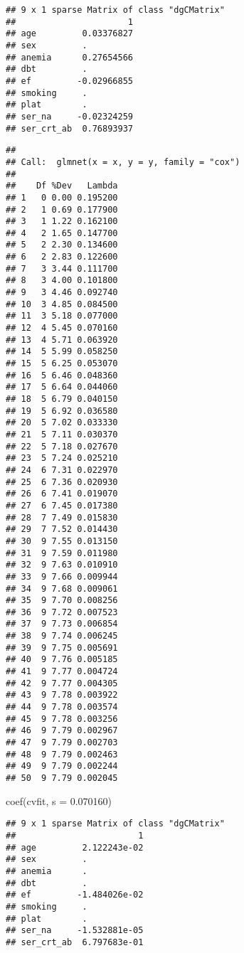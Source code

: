 \documentclass[
]{article}
\newenvironment{Shaded}{\begin{snugshade}}{\end{snugshade}}
\newcommand{\AttributeTok}[1]{\textcolor[rgb]{0.77,0.63,0.00}{#1}}
\newcommand{\FloatTok}[1]{\textcolor[rgb]{0.00,0.00,0.81}{#1}}
\newcommand{\FunctionTok}[1]{\textcolor[rgb]{0.00,0.00,0.00}{#1}}
\newcommand{\NormalTok}[1]{#1}
\newcommand{\SpecialCharTok}[1]{\textcolor[rgb]{0.00,0.00,0.00}{#1}}
\begin{document}
\begin{verbatim}
## 9 x 1 sparse Matrix of class "dgCMatrix"
##                      1
## age         0.03376827
## sex         .         
## anemia      0.27654566
## dbt         .         
## ef         -0.02966855
## smoking     .         
## plat        .         
## ser_na     -0.02324259
## ser_crt_ab  0.76893937
\end{verbatim}

\begin{Shaded}
\end{Shaded}

\begin{verbatim}
## 
## Call:  glmnet(x = x, y = y, family = "cox") 
## 
##    Df %Dev   Lambda
## 1   0 0.00 0.195200
## 2   1 0.69 0.177900
## 3   1 1.22 0.162100
## 4   2 1.65 0.147700
## 5   2 2.30 0.134600
## 6   2 2.83 0.122600
## 7   3 3.44 0.111700
## 8   3 4.00 0.101800
## 9   3 4.46 0.092740
## 10  3 4.85 0.084500
## 11  3 5.18 0.077000
## 12  4 5.45 0.070160
## 13  4 5.71 0.063920
## 14  5 5.99 0.058250
## 15  5 6.25 0.053070
## 16  5 6.46 0.048360
## 17  5 6.64 0.044060
## 18  5 6.79 0.040150
## 19  5 6.92 0.036580
## 20  5 7.02 0.033330
## 21  5 7.11 0.030370
## 22  5 7.18 0.027670
## 23  5 7.24 0.025210
## 24  6 7.31 0.022970
## 25  6 7.36 0.020930
## 26  6 7.41 0.019070
## 27  6 7.45 0.017380
## 28  7 7.49 0.015830
## 29  7 7.52 0.014430
## 30  9 7.55 0.013150
## 31  9 7.59 0.011980
## 32  9 7.63 0.010910
## 33  9 7.66 0.009944
## 34  9 7.68 0.009061
## 35  9 7.70 0.008256
## 36  9 7.72 0.007523
## 37  9 7.73 0.006854
## 38  9 7.74 0.006245
## 39  9 7.75 0.005691
## 40  9 7.76 0.005185
## 41  9 7.77 0.004724
## 42  9 7.77 0.004305
## 43  9 7.78 0.003922
## 44  9 7.78 0.003574
## 45  9 7.78 0.003256
## 46  9 7.79 0.002967
## 47  9 7.79 0.002703
## 48  9 7.79 0.002463
## 49  9 7.79 0.002244
## 50  9 7.79 0.002045
\end{verbatim}

\begin{Shaded}
\begin{Highlighting}[]
\FunctionTok{coef}\NormalTok{(cvfit, }\AttributeTok{s =} \FloatTok{0.070160}\NormalTok{)}
\end{Highlighting}
\end{Shaded}

\begin{verbatim}
## 9 x 1 sparse Matrix of class "dgCMatrix"
##                        1
## age         2.122243e-02
## sex         .           
## anemia      .           
## dbt         .           
## ef         -1.484026e-02
## smoking     .           
## plat        .           
## ser_na     -1.532881e-05
## ser_crt_ab  6.797683e-01
\end{verbatim}
\end{document}
